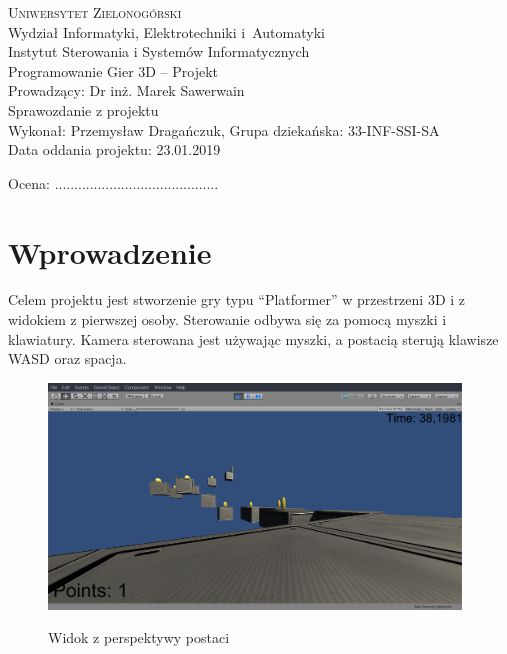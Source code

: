 \documentclass[10pt,a4paper]{article}
\begin{document}
\pagestyle{empty}

\begin{center}
\textsc{\Huge{Uniwersytet Zielonogórski}}\\
\LARGE{Wydział Informatyki, Elektrotechniki i~Automatyki}\\
\large{Instytut Sterowania i Systemów Informatycznych}\\
\vspace{0.5cm}
\Large{Programowanie Gier 3D -- Projekt}\\
Prowadzący: Dr inż. Marek Sawerwain \\ \vspace{1cm}
\LARGE{Sprawozdanie z projektu}\\

\vspace{0.5cm}
\Large{Wykonał: Przemysław Dragańczuk, Grupa dziekańska: 33-INF-SSI-SA} \\

\Large{Data oddania projektu: 23.01.2019}
\vspace{1cm}

\begin{flushleft}
	Ocena: ..........................................
\end{flushleft}

\vspace{1cm}
\end{center}



%
%

\begin{multicols}{2}
	\footnotesize
	\tableofcontents
\end{multicols}

\noindent\makebox[\linewidth]{\rule{0.6\paperwidth}{0.4pt}}

\section{Wprowadzenie}
\label{sec:wprowadzenie}

Celem projektu jest stworzenie gry typu ``Platformer'' w przestrzeni 3D
i z widokiem z pierwszej osoby. Sterowanie odbywa się za pomocą
myszki i  klawiatury. Kamera sterowana jest używając myszki, a postacią sterują
klawisze WASD oraz spacja.

\begin{figure}[hb]
	\centering
	\includegraphics[height=6cm]{screens/lvl.png}
	\label{fig:screen-lvl}
	\caption{Widok z perspektywy postaci}
\end{figure}
\end{document}
